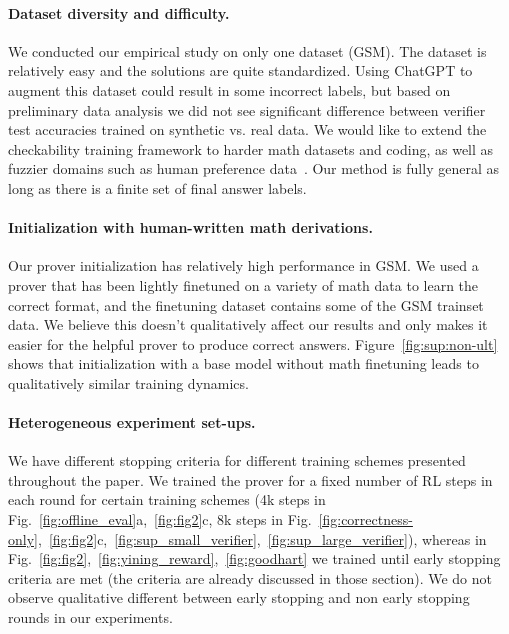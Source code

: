 \documentclass{article}
\begin{document}
\paragraph{Dataset diversity and difficulty.} We conducted our empirical study on only one dataset (GSM). The dataset is relatively easy and the solutions are quite standardized. Using ChatGPT to augment this dataset could result in some incorrect labels, but based on preliminary data analysis we did not see significant difference between verifier test accuracies trained on synthetic vs. real data. We would like to extend the checkability training framework to harder math datasets and coding, as well as fuzzier domains such as human preference data~\citep{ouyang2022training}. Our method is fully general as long as there is a finite set of final answer labels.


\paragraph{Initialization with human-written math derivations.}
Our prover initialization has relatively high performance in GSM. We used a prover that has been lightly finetuned on a variety of math data to learn the correct format, and the finetuning dataset contains some of the GSM trainset data. We believe this doesn't qualitatively affect our results and only makes it easier for the helpful prover to produce correct answers. Figure~\ref{fig:sup:non-ult} shows that initialization with a base model without math finetuning leads to qualitatively similar training dynamics.


\paragraph{Heterogeneous experiment set-ups.}
We have different stopping criteria for different training schemes presented throughout the paper. We trained the prover for a fixed number of RL steps in each round for certain training schemes (4k steps in Fig.~\ref{fig:offline_eval}a,~\ref{fig:fig2}c, 8k steps in Fig.~\ref{fig:correctness-only},~\ref{fig:fig2}c,~\ref{fig:sup_small_verifier},~\ref{fig:sup_large_verifier}), whereas in Fig.~\ref{fig:fig2},~\ref{fig:yining_reward},~\ref{fig:goodhart} we trained until early stopping criteria are met (the criteria are already discussed in those section). We do not observe qualitative different between early stopping and non early stopping rounds in our experiments.
\end{document}
